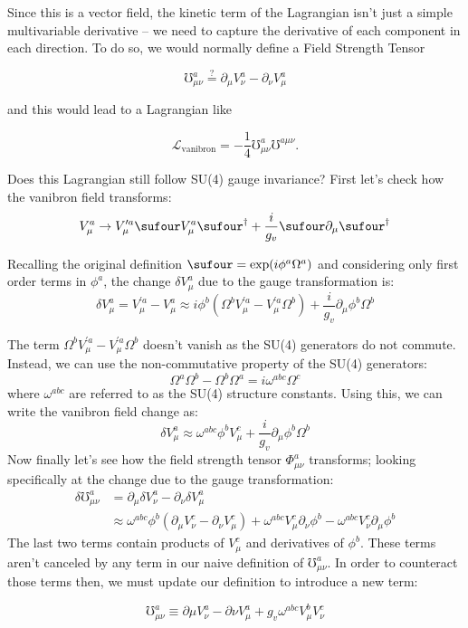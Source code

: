Since this is a vector field, the kinetic term of the Lagrangian isn't just a simple multivariable derivative -- we need to capture the derivative of each component in each direction. To do so, we would normally define a Field Strength Tensor

\[\mho^a_{\mu \nu} \overset{?}{=} \partial_{\mu}V^a_{\nu} - \partial_{\nu}V^a_{\mu}\]

and this would lead to a Lagrangian like

\[
  \mathcal{L}_{\text{vanibron}} = -\frac{1}{4} \mho^a_{\mu \nu} \mho^{a \mu \nu}.
\]

Does this Lagrangian still follow SU(4) gauge invariance? First let's check how the vanibron field transforms:
\[
  V^a_{\mu} \rightarrow V^{\prime a}_{\mu} \sufour V^a_{\mu} \sufour^{\dag} + \frac{i}{g_v} \sufour \partial_{\mu} \sufour^{\dag}
\]

Recalling the original definition \(\sufour = \exp(i \phi^a \Omega^a)\) and considering only first order terms in \(\phi^a\), the change \(\delta V^a_{\mu}\) due to the gauge transformation is:
\[
  \delta V^a_{\mu} = V^{\prime a}_{\mu} - V^a_{\mu} \approx i \phi^b\left(\Omega^b V^{\prime a}_{\mu} - V^{\prime a}_{\mu}\Omega^b \right) + \frac{i}{g_v} \partial_{\mu} \phi^b \Omega^b
\]

The term \(\Omega^b V^{\prime a}_{\mu} - V^{\prime a}_{\mu}\Omega^b\) doesn't vanish as the SU(4) generators do not commute. Instead, we can use the non-commutative property of the SU(4) generators:
\[
  \Omega^a\Omega^b -  \Omega^b\Omega^a = i \omega^{abc}\Omega^c
\]
where \(\omega^{abc}\) are referred to as the SU(4) structure constants. Using this, we can write the vanibron field change as:
\[
  \delta V^a_{\mu} \approx \omega^{abc}\phi^bV^c_{\mu} + \frac{i}{g_v} \partial_{\mu} \phi^b \Omega^b
\]
Now finally let's see how the field strength tensor \(\Phi^a_{\mu\nu}\) transforms; looking specifically at the change due to the gauge transformation:
\begin{align*}
  \delta\mho^a_{\mu \nu}
   & = \partial_{\mu}\delta V^a_{\nu} - \partial_{\nu}\delta V^a_{\mu}                        \\
   & \approx \omega^{abc}\phi^b\left(\partial_{\mu}V^c_{\nu} - \partial_{\nu}V^c_{\mu}\right)
  +\omega^{abc}V^c_{\mu}\partial_{\nu}\phi^b - \omega^{abc}V^c_{\nu}\partial_{\mu}\phi^b
\end{align*}
The last two terms contain products of \(V^c_{\mu}\) and derivatives of \(\phi^b\). These terms aren't canceled by any term in our naive definition of \(\mho^a_{\mu \nu}\). In order to counteract those terms then, we must update our definition to introduce a new term:
\begin{definition}
  \[\mho^a_{\mu \nu} \equiv \partial{\mu}V^a_{\nu} - \partial{\nu}V^a_{\mu} + g_v \omega^{abc}V^{b}_{\mu}V^{c}_{\nu} \]
\end{definition}

